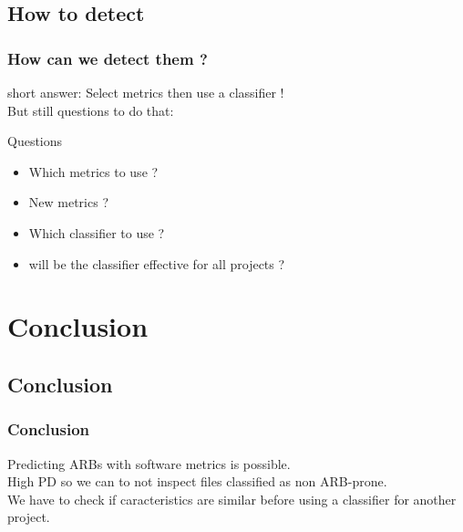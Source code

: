 \documentclass{beamer}
\begin{document}
\subsection{How to detect}
\begin{frame}
 \frametitle{How can we detect them ?}
 short answer: \alert{Select metrics then use a classifier !}\\
 But still questions to do that:\\
 \begin{block}{Questions}
  \begin{itemize}
   \item Which metrics to use ?
   \item New metrics ?
   \item Which classifier to use ?
   \item will be the classifier effective for all projects ?
  \end{itemize}
 \end{block}
\end{frame}









\section{Conclusion}
\subsection{Conclusion}
\begin{frame}
 \frametitle{Conclusion}
 Predicting ARBs with software metrics is possible.\\
 \vspace{1cm}
 High PD so we can to not inspect files classified as non ARB-prone.\\%
 \vspace{1cm}
 We have to check if caracteristics are similar before using a classifier for another project.
\end{frame}
\end{document}
